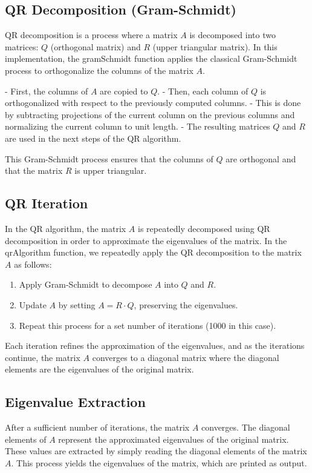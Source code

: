 \documentclass[journal]{IEEEtran}
\begin{document}
\subsection*{QR Decomposition (Gram-Schmidt)}
QR decomposition is a process where a matrix \( A \) is decomposed into two matrices: \( Q \) (orthogonal matrix) and \( R \) (upper triangular matrix). In this implementation, the gramSchmidt function applies the classical Gram-Schmidt process to orthogonalize the columns of the matrix \( A \). 

- First, the columns of \( A \) are copied to \( Q \).
- Then, each column of \( Q \) is orthogonalized with respect to the previously computed columns.
- This is done by subtracting projections of the current column on the previous columns and normalizing the current column to unit length.
- The resulting matrices \( Q \) and \( R \) are used in the next steps of the QR algorithm.

This Gram-Schmidt process ensures that the columns of \( Q \) are orthogonal and that the matrix \( R \) is upper triangular.

\subsection*{QR Iteration}
In the QR algorithm, the matrix \( A \) is repeatedly decomposed using QR decomposition in order to approximate the eigenvalues of the matrix. In the qrAlgorithm function, we repeatedly apply the QR decomposition to the matrix \( A \) as follows:
\begin{enumerate}

 \item Apply Gram-Schmidt to decompose \( A \) into \( Q \) and \( R \).
 \item Update \( A \) by setting \( A = R \cdot Q \), preserving the eigenvalues.
 \item Repeat this process for a set number of iterations (1000 in this case).
\end{enumerate}
Each iteration refines the approximation of the eigenvalues, and as the iterations continue, the matrix \( A \) converges to a diagonal matrix where the diagonal elements are the eigenvalues of the original matrix.

\subsection*{Eigenvalue Extraction}
After a sufficient number of iterations, the matrix \( A \) converges. The diagonal elements of \( A \) represent the approximated eigenvalues of the original matrix. These values are extracted by simply reading the diagonal elements of the matrix \( A \). This process yields the eigenvalues of the matrix, which are printed as output.
\end{document}
